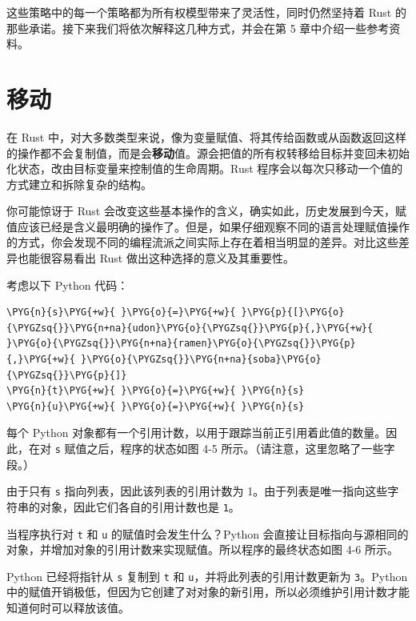 这些策略中的每一个策略都为所有权模型带来了灵活性，同时仍然坚持着 Rust 的那些承诺。接下来我们将依次解释这几种方式，并会在第 5 章中介绍一些参考资料。

\section{移动}

在 Rust 中，对大多数类型来说，像为变量赋值、将其传给函数或从函数返回这样的操作都不会复制值，而是会\textbf{移动}值。源会把值的所有权转移给目标并变回未初始化状态，改由目标变量来控制值的生命周期。Rust 程序会以每次只移动一个值的方式建立和拆除复杂的结构。

你可能惊讶于 Rust 会改变这些基本操作的含义，确实如此，历史发展到今天，赋值应该已经是含义最明确的操作了。但是，如果仔细观察不同的语言处理赋值操作的方式，你会发现不同的编程流派之间实际上存在着相当明显的差异。对比这些差异也能很容易看出 Rust 做出这种选择的意义及其重要性。

考虑以下 Python 代码：

\begin{Verbatim}[commandchars=\\\{\},breaklines=true,breakanywhere=true,fontsize=\codefont,xleftmargin=17bp]
\PYG{n}{s}\PYG{+w}{ }\PYG{o}{=}\PYG{+w}{ }\PYG{p}{[}\PYG{o}{\PYGZsq{}}\PYG{n+na}{udon}\PYG{o}{\PYGZsq{}}\PYG{p}{,}\PYG{+w}{ }\PYG{o}{\PYGZsq{}}\PYG{n+na}{ramen}\PYG{o}{\PYGZsq{}}\PYG{p}{,}\PYG{+w}{ }\PYG{o}{\PYGZsq{}}\PYG{n+na}{soba}\PYG{o}{\PYGZsq{}}\PYG{p}{]}
\PYG{n}{t}\PYG{+w}{ }\PYG{o}{=}\PYG{+w}{ }\PYG{n}{s}
\PYG{n}{u}\PYG{+w}{ }\PYG{o}{=}\PYG{+w}{ }\PYG{n}{s}
\end{Verbatim}

每个 Python 对象都有一个引用计数，以用于跟踪当前正引用着此值的数量。因此，在对 \texttt{s} 赋值之后，程序的状态如图 4-5 所示。（请注意，这里忽略了一些字段。）


由于只有 \texttt{s} 指向列表，因此该列表的引用计数为 1。由于列表是唯一指向这些字符串的对象，因此它们各自的引用计数也是 \texttt{1}。

当程序执行对 \texttt{t} 和 \texttt{u} 的赋值时会发生什么？Python 会直接让目标指向与源相同的对象，并增加对象的引用计数来实现赋值。所以程序的最终状态如图 4-6 所示。


Python 已经将指针从 \texttt{s} 复制到 \texttt{t} 和 \texttt{u}，并将此列表的引用计数更新为 \texttt{3}。Python 中的赋值开销极低，但因为它创建了对对象的新引用，所以必须维护引用计数才能知道何时可以释放该值。

